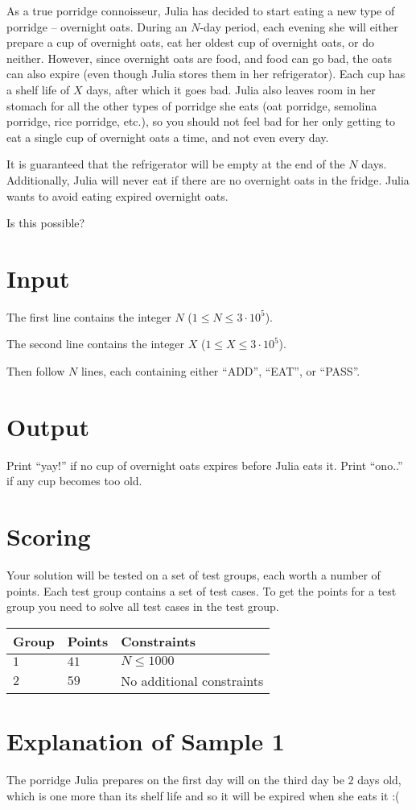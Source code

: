 
As a true porridge connoisseur, Julia has decided to start eating a new type of porridge --
overnight oats. During an $N$-day period, each evening she will either prepare a cup of overnight
oats, eat her oldest cup of overnight oats, or do neither. However, since overnight oats are food,
and food can go bad, the oats can also expire (even though Julia stores them in her refrigerator).
Each cup has a shelf life of $X$ days, after which it goes bad. Julia also leaves room in her
stomach for all the other types of porridge she eats (oat porridge, semolina porridge, rice
porridge, etc.), so you should not feel bad for her only getting to eat a single cup of overnight
oats a time, and not even every day.

It is guaranteed that the refrigerator will be empty at the end of the $N$ days. Additionally, Julia
will never eat if there are no overnight oats in the fridge. Julia wants to avoid eating expired
overnight oats.

Is this possible?

\section*{Input}

The first line contains the integer $N$ ($1 \leq N \leq 3 \cdot 10^5$).

The second line contains the integer $X$ ($1 \leq X \leq 3 \cdot 10^5$).

Then follow $N$ lines, each containing either ``ADD'', ``EAT'', or ``PASS''.

\section*{Output}

Print ``yay!'' if no cup of overnight oats expires before Julia eats it.
Print ``ono..'' if any cup becomes too old.



\section*{Scoring}
Your solution will be tested on a set of test groups, each worth a number of points. Each test group contains
a set of test cases. To get the points for a test group you need to solve all test cases in the test group.

\noindent
\begin{tabular}{| l | l | p{12cm} |}
  \hline
  \textbf{Group} & \textbf{Points} & \textbf{Constraints} \\ \hline
  $1$    & $41$       & $N \leq 1000$ \\ \hline
  $2$    & $59$       & No additional constraints \\ \hline
\end{tabular}


\section*{Explanation of Sample 1}

The porridge Julia prepares on the first day will on the third day be $2$ days old, which is one
more than its shelf life and so it will be expired when she eats it :(
